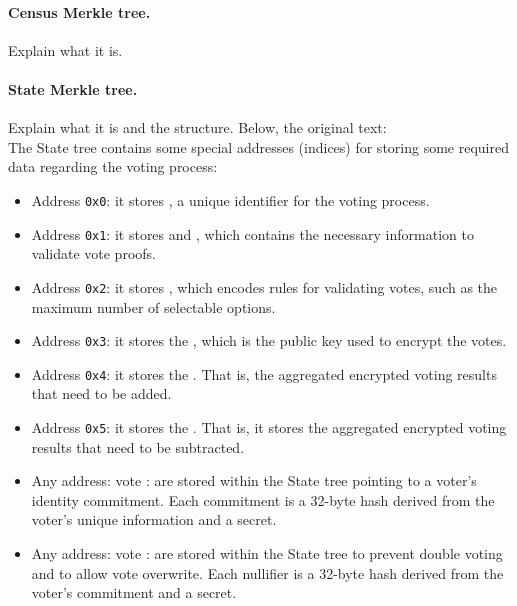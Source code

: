 \paragraph{Census Merkle tree.} Explain what it is. \\


\paragraph{State Merkle tree.} Explain what it is and the structure. Below, the original text:\\

The State tree contains some special addresses (indices) for storing some required data regarding the voting process:

\begin{itemize}
	\item Address \texttt{0x0}: it stores \processid, a unique identifier for the voting process.
	\item Address \texttt{0x1}: it stores \censusroot and \type, which contains the necessary information to validate vote proofs.
	\item Address \texttt{0x2}: it stores \ballotmode, which encodes rules for validating votes, such as the maximum number of selectable options.
	\item Address \texttt{0x3}: it stores the \epk, which is the public key used to encrypt the votes.
	\item Address \texttt{0x4}: it stores the \addaccumulator. That is, the aggregated encrypted voting results that need to be added.
	\item Address \texttt{0x5}: it stores the \substractaccumulator. That is, it stores the aggregated encrypted voting results that need to be subtracted.
	\item Any address: vote \addresses: are stored within the State tree pointing to a voter's identity commitment. Each commitment is a 32-byte hash derived from the voter's unique information and a secret.
	\item Any address: vote \nullifiers: are stored within the State tree to prevent double voting and to allow vote overwrite. Each nullifier is a 32-byte hash derived from the voter's commitment and a secret.
\end{itemize}

